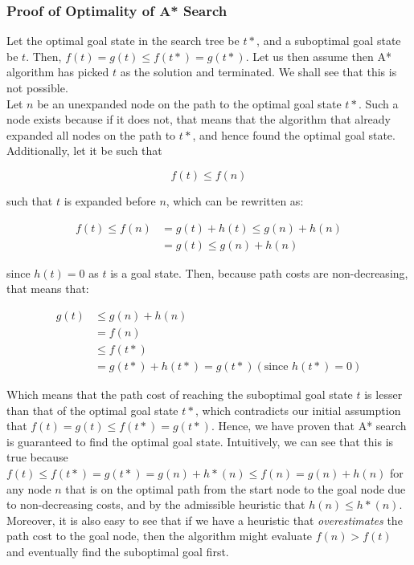 \documentclass[12pt]{article}
\begin{document}
\subsubsection{Proof of Optimality of A* Search}

Let the optimal goal state in the search tree be $t*$, and a suboptimal goal state be $t$. Then, $f(t) = g(t) \leq f(t*) = g(t*)$. Let us then assume then A* algorithm has picked $t$ as the solution and terminated. We shall see that this is not possible.\\

Let $n$ be an unexpanded node on the path to the optimal goal state $t*$. Such a node exists because if it does not, that means that the algorithm that already expanded all nodes on the path to $t*$, and hence found the optimal goal state. Additionally, let it be such that 

\begin{equation*}
f(t) \leq f(n)
\end{equation*}

such that $t$ is expanded before $n$, which can be rewritten as:

 \begin{equation*}
 \begin{aligned}
f(t) \leq f(n) & = g(t) + h(t) \leq g(n) + h(n)\\
&= g(t) \leq g(n) + h(n)
\end{aligned}
\end{equation*}

since $h(t) = 0$ as $t$ is a goal state. Then, because path costs are non-decreasing, that means that:

 \begin{equation*}
 \begin{aligned}
g(t) & \leq g(n) + h(n) \\
& = f(n) \\
& \leq f(t*) \\
& = g(t*) + h(t*) = g(t*) (\text{since $h(t*) = 0$})
\end{aligned}
\end{equation*}

Which means that the path cost of reaching the suboptimal goal state $t$ is lesser than that of the optimal goal state $t*$, which contradicts our initial assumption that $f(t) = g(t) \leq f(t*) = g(t*)$. Hence, we have proven that A* search is guaranteed to find the optimal goal state. Intuitively, we can see that this is true because $f(t) \leq f(t*) = g(t*) = g(n) + h*(n)  \leq f(n) = g(n) + h(n)$ for any node $n$ that is on the optimal path from the start node to the goal node due to non-decreasing costs, and by the admissible heuristic that $h(n) \leq h*(n)$. Moreover, it is also easy to see that if we have a heuristic that \textit{overestimates} the path cost to the goal node, then the algorithm might evaluate $f(n) > f(t)$ and eventually find the suboptimal goal first.\\
\end{document}
